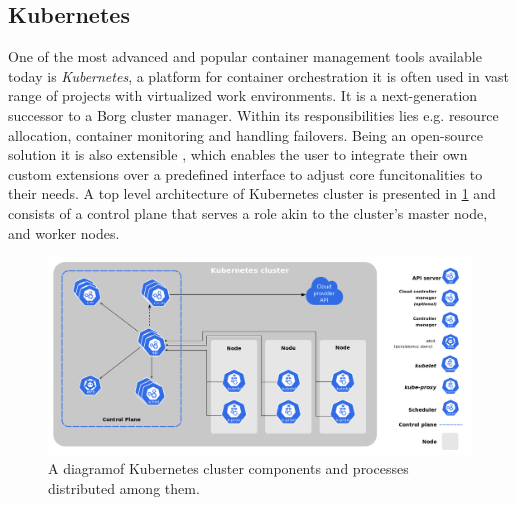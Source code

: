 \subsection{Kubernetes}
\label{s:ProblemDomain:Kubernetes}

One of the most advanced and popular container management tools available today is \emph{Kubernetes}, a platform for container orchestration it is often used in vast range of projects with virtualized work environments.
It is a next-generation successor \cite{b:Borg-K8s-predecessor} to a Borg cluster manager.
Within its responsibilities lies e.g. resource allocation, container monitoring and handling failovers.
Being an open-source solution it is also extensible \cite{b:Kubernetes-what-is}, which enables the user to integrate their own custom extensions over a predefined interface to adjust core funcitonalities to their needs. A top level architecture of Kubernetes cluster is presented in \cref{fig:kubernetes:architecture} and consists of a control plane that serves a role akin to the cluster's master node, and worker nodes.

\begin{figure}[H]
\centering
\includegraphics[width=1\linewidth]{figures/2-1-k8s-arch.png}
\caption[Kubernetes cluster architecture diagram]{A diagram\footnotemark of Kubernetes cluster components and processes distributed among them.}


\label{fig:kubernetes:architecture}
\end{figure}

